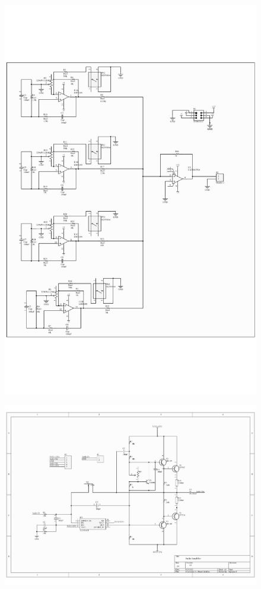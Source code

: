 \documentclass[a4paper,12pt,oneside,pdflatex,italian,final,twocolumn]{article}
\begin{document}
\begin{figure}[p]
\begin{center}
\vspace{-4cm}
    \includegraphics[width=.8\textwidth]{oscillator}
\end{center}
\end{figure}
\begin{figure}[p]
\begin{center}
\vspace{-5cm}
    \includegraphics[width=.8\textwidth]{images/amplifier_sch.pdf}
\end{center}
\end{figure}
\end{document}
